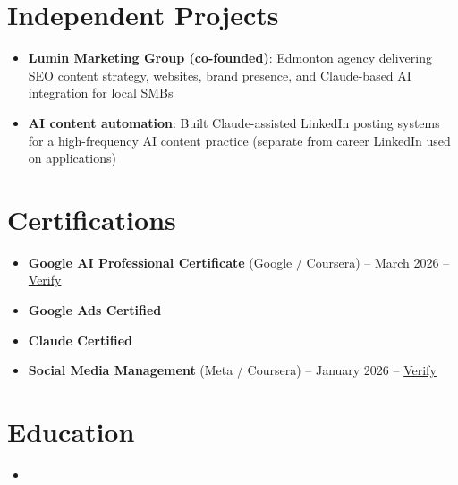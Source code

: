 \documentclass[11pt,a4paper,sans]{moderncv}
\begin{document}
\section{Independent Projects}
\vspace{1pt}
\begin{itemize}
\item \textbf{Lumin Marketing Group (co-founded)}: Edmonton agency delivering SEO content strategy, websites, brand presence, and Claude-based AI integration for local SMBs
\item \textbf{AI content automation}: Built Claude-assisted LinkedIn posting systems for a high-frequency AI content practice (separate from career LinkedIn used on applications)
\end{itemize}

\section{Certifications}
\vspace{1pt}
\begin{itemize}
\item \textbf{Google AI Professional Certificate} (Google / Coursera) -- March 2026 -- \href{https://www.coursera.org/account/accomplishments/verify/professional-cert/54E1P3RBHVL8}{Verify}
\item \textbf{Google Ads Certified}
\item \textbf{Claude Certified}
\item \textbf{Social Media Management} (Meta / Coursera) -- January 2026 -- \href{https://www.coursera.org/account/accomplishments/verify/7NOVGMU2L69G}{Verify}
\end{itemize}

\section{Education}
\vspace{1pt}
\begin{itemize}
\item{}
\end{itemize}
\end{document}

